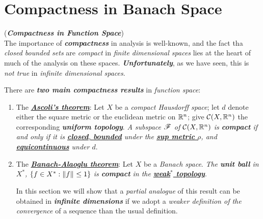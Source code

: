 \documentclass[11pt]{article}
\begin{document}
\section{Compactness in Banach Space}
\begin{remark} (\emph{\textbf{Compactness in Function Space}})\\
The importance of \emph{\textbf{compactness}} in analysis is well-known, and the fact tha \emph{closed bounded sets} are \emph{compact} in \emph{finite dimensional spaces} lies at the heart of much of the analysis on these spaces. \emph{\textbf{Unfortunately}}, as we have seen, this is \emph{not true} in \emph{infinite dimensional spaces}.

There are \emph{\textbf{two main compactness results}} in \emph{function space}:
\begin{enumerate}
\item The \underline{\textbf{\emph{Ascoli's theorem}}}: Let $X$ be a \emph{compact Hausdorff space}; let $d$ denote either the square metric or the euclidean metric on ${\mathbb R}^n$; give ${\mathcal C}(X, {\mathbb R}^n)$ the corresponding \textbf{\emph{uniform topology}}. \emph{A subspace ${\mathscr F}$ of ${\mathcal C}(X, {\mathbb R}^n)$ is \textbf{compact} if and only if it is \underline{\textbf{closed}, \textbf{bounded}} under the \underline{\textbf{sup metric} $\rho$}, and \underline{\textbf{equicontinuous}} under $d$}.

\item The \underline{\textbf{\emph{Banach-Alaoglu theorem}}}: Let $X$ be a \emph{Banach space}. \emph{The \textbf{unit ball} in $X^{*}$, $\{f \in X^{*}: \left\|f\right\|_{}\le 1\}$ is \textbf{compact} in the \underline{\textbf{weak$^{*}$ topology}}}.

In this section we will show that a \emph{partial analogue} of this result can be obtained in \emph{\textbf{infinite dimensions}} if we adopt a \emph{weaker definition of the convergence} of a sequence than the usual definition.
\end{enumerate}


\end{remark}
\end{document}
